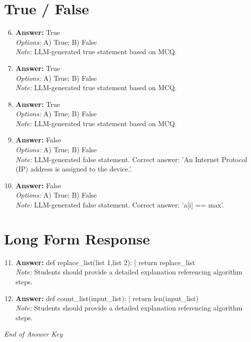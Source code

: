 \documentclass[12pt]{article}
\begin{document}
\section*{True / False}
\begin{enumerate}[label=\arabic*.]
\setcounter{enumi}{5}
\item \textbf{Answer:} True
\\ \textit{Options:} A) True; B) False
\\ \textit{Note:} LLM-generated true statement based on MCQ.
\item \textbf{Answer:} True
\\ \textit{Options:} A) True; B) False
\\ \textit{Note:} LLM-generated true statement based on MCQ.
\item \textbf{Answer:} True
\\ \textit{Options:} A) True; B) False
\\ \textit{Note:} LLM-generated true statement based on MCQ.
\item \textbf{Answer:} False
\\ \textit{Options:} A) True; B) False
\\ \textit{Note:} LLM-generated false statement. Correct answer: 'An Internet Protocol (IP) address is assigned to the device.'.
\item \textbf{Answer:} False
\\ \textit{Options:} A) True; B) False
\\ \textit{Note:} LLM-generated false statement. Correct answer: 'a[i] == max'.
\end{enumerate}

\section*{Long Form Response}
\begin{enumerate}[label=\arabic*.]
\setcounter{enumi}{10}
\item \textbf{Answer:} def replace\_list(list 1,list 2): | return replace\_list
\\ \textit{Note:} Students should provide a detailed explanation referencing algorithm steps.
\item \textbf{Answer:} def count\_list(input\_list): | return len(input\_list)
\\ \textit{Note:} Students should provide a detailed explanation referencing algorithm steps.
\end{enumerate}

\vfill
\noindent\textit{End of Answer Key}
\end{document}

